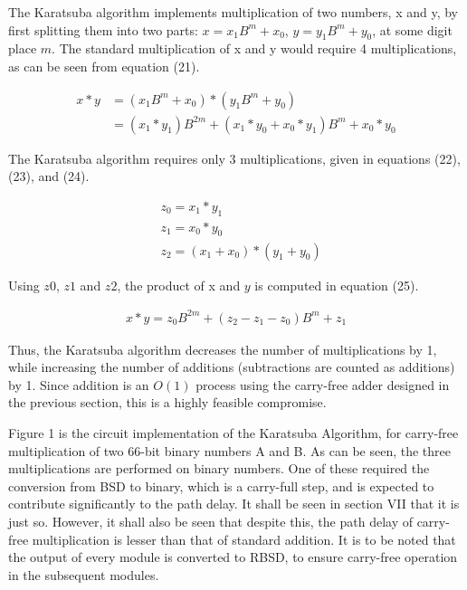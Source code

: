 \documentclass[conference]{IEEEtran}
\begin{document}
The Karatsuba algorithm implements multiplication of two numbers, x and y, by first splitting them into two parts: $x = x_{1}B^{m} + x_{0}$, $y = y_{1}B^{m} + y_{0}$, at some digit place $m$. The standard multiplication of x and y would require 4 multiplications, as can be seen from equation (21).

\vspace{-1em}
\begin{equation}
\begin{aligned}
x * y &= (x_{1}B^{m} + x_{0}) * (y_{1}B^{m} + y_{0})\\
&= (x_{1} * y_{1})B^{2m} + (x_{1}*y_{0} + x_{0}*y_{1})B^{m} + x_{0}*y_{0}
\end{aligned}
\end{equation}

The Karatsuba algorithm requires only 3 multiplications, given in equations (22), (23), and (24).

\vspace{-1em}
\begin{align}
&z_{0} = x_{1} * y_{1}\\
&z_{1} = x_{0} * y_{0}\\
&z_{2} = (x_{1} + x_{0}) * (y_{1} + y_{0})
\end{align}

Using $z0$, $z1$ and $z2$, the product of x and $y$ is computed in equation (25).

\vspace{-1em}
\begin{align}
x * y = z_{0}B^{2m} + (z_{2} - z_{1} - z_{0})B^{m} + z_{1}
\end{align}

Thus, the Karatsuba algorithm decreases the number of multiplications by 1, while increasing the number of additions (subtractions are counted as additions) by 1. Since addition is an $O(1)$ process using the carry-free adder designed in the previous section, this is a highly feasible compromise.

Figure 1 is the circuit implementation of the Karatsuba Algorithm, for carry-free multiplication of two 66-bit binary numbers A and B. As can be seen, the three multiplications are performed on binary numbers. One of these required the conversion from BSD to binary, which is a carry-full step, and is expected to contribute significantly to the path delay. It shall be seen in section VII that it is just so. However, it shall also be seen that despite this, the path delay of carry-free multiplication is lesser than that of standard addition. It is to be noted that the output of every module is converted to RBSD, to ensure carry-free operation in the subsequent modules.
\end{document}
